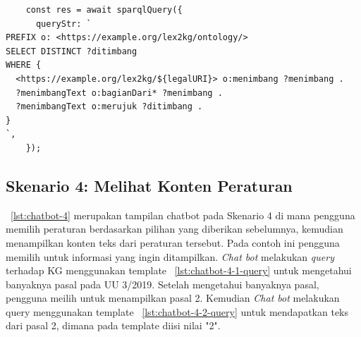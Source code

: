 \begin{listing}[H]
  \begin{verbatim}
    const res = await sparqlQuery({
      queryStr: `
PREFIX o: <https://example.org/lex2kg/ontology/>
SELECT DISTINCT ?ditimbang
WHERE {
  <https://example.org/lex2kg/${legalURI}> o:menimbang ?menimbang .
  ?menimbangText o:bagianDari* ?menimbang .
  ?menimbangText o:merujuk ?ditimbang .
}
`,
    });
  \end{verbatim}
  \caption{\textit{Query} template untuk Skenario 3}
  \label{lst:chatbot-3-query}
\end{listing}

\subsection{Skenario 4: Melihat Konten Peraturan}
\label{subsec:skenario-4}

\lst~\ref{lst:chatbot-4} merupakan tampilan chatbot pada Skenario 4 di mana pengguna memilih
peraturan berdasarkan pilihan yang diberikan sebelumnya, kemudian menampilkan konten teks dari
peraturan tersebut. Pada contoh ini pengguna memilih  untuk informasi yang ingin
ditampilkan. \textit{Chat bot} melakukan \textit{query} terhadap KG menggunakan template
\lst~\ref{lst:chatbot-4-1-query} untuk mengetahui banyaknya pasal pada UU 3/2019. Setelah mengetahui
banyaknya pasal, pengguna meilih untuk menampilkan pasal 2. Kemudian \textit{Chat bot} melakukan query
menggunakan template \lst~\ref{lst:chatbot-4-2-query} untuk mendapatkan teks dari pasal 2, dimana
 pada template diisi nilai "2".

